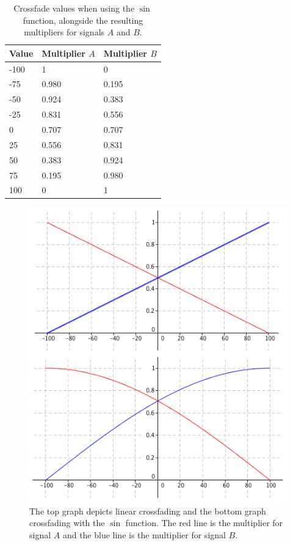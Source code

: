 \documentclass[12pt,twoside]{report}
\begin{document}
\begin{table}[h!]

  \centering

  \begin{tabular}[]{| l | l | l |}
    \hline
    \rowcolor[gray]{0.8}
    Value & Multiplier $A$ & Multiplier $B$ \\\hline
    -100 & 1 & 0\\\hline
    -75 & 0.980 & 0.195\\\hline
    -50 & 0.924 & 0.383\\\hline
    -25 & 0.831 & 0.556\\\hline
    0 & 0.707 & 0.707\\\hline
    25 & 0.556 & 0.831\\\hline
    50 & 0.383 & 0.924\\\hline
    75 & 0.195 & 0.980\\\hline
    100 & 0 & 1\\
    \hline
  \end{tabular}

  \caption{Crossfade values when using the $\sin$ function, alongside the resulting multipliers for signals $A$ and $B$.}

  \label{tb:scrossfade}

\end{table}

\begin{figure}[p!]

  \includegraphics[scale=0.7]{img/lscrossfade}

  \caption{The top graph depicts linear crossfading and the bottom graph crossfading with the $\sin$ function. The red line is the multiplier for signal $A$ and the blue line is the multiplier for signal $B$.}

  \label{fig:lscrossfade}

\end{figure}
\end{document}

